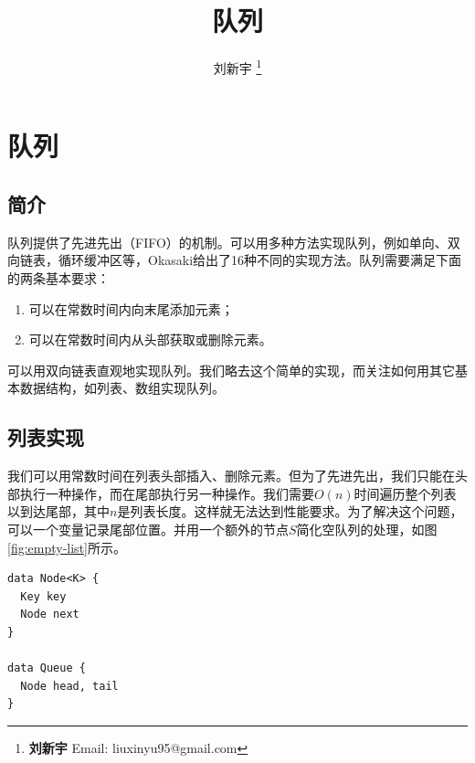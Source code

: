 \documentclass[b5paper]{ctexart}
\begin{document}
\title{队列}

\author{刘新宇
\thanks{{\bfseries 刘新宇 } \newline
  Email: liuxinyu95@gmail.com \newline}
  }

\maketitle
\fi


\ifx\wholebook\relax
\chapter{队列}
\fi

\section{简介}
\label{introduction}

队列提供了先进先出（FIFO）的机制。可以用多种方法实现队列，例如单向、双向链表，循环缓冲区等，Okasaki给出了16种不同的实现方法\cite{okasaki-book}。队列需要满足下面的两条基本要求：

\begin{enumerate}
\item 可以在常数时间内向末尾添加元素；
\item 可以在常数时间内从头部获取或删除元素。
\end{enumerate}

可以用双向链表直观地实现队列。我们略去这个简单的实现，而关注如何用其它基本数据结构，如列表、数组实现队列。

\section{列表实现}

我们可以用常数时间在列表头部插入、删除元素。但为了先进先出，我们只能在头部执行一种操作，而在尾部执行另一种操作。我们需要$O(n)$时间遍历整个列表以到达尾部，其中$n$是列表长度。这样就无法达到性能要求。为了解决这个问题，可以一个变量记录尾部位置。并用一个额外的节点$S$简化空队列的处理，如图\ref{fig:empty-list}所示。

\lstset{frame = single}
\begin{lstlisting}[language = Bourbaki]
data Node<K> {
  Key key
  Node next
}

data Queue {
  Node head, tail
}
\end{lstlisting}
\end{document}
